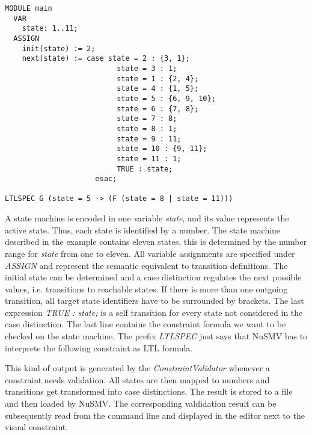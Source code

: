 \begin{lstlisting}[float = htbp, captionpos=b, breaklines=true, showspaces=false, showtabs=false, tabsize=2, caption=Example of a NuSMV diagram file., label=lst:nusmv]
MODULE main
  VAR
    state: 1..11;
  ASSIGN
    init(state) := 2;
    next(state) := case state = 2 : {3, 1};
                          state = 3 : 1;
                          state = 1 : {2, 4};
                          state = 4 : {1, 5};
                          state = 5 : {6, 9, 10};
                          state = 6 : {7, 8};
                          state = 7 : 8;
                          state = 8 : 1;
                          state = 9 : 11;
                          state = 10 : {9, 11};
                          state = 11 : 1;
                          TRUE : state;
                     esac;

LTLSPEC G (state = 5 -> (F (state = 8 | state = 11)))
\end{lstlisting}
A state machine is encoded in one variable \emph{state}, and its value represents the active state. Thus, each state is identified by a number. The state machine described in the example contains eleven states, this is determined by the number range for \emph{state} from one to eleven. All variable assignments are specified under \emph{ASSIGN} and represent the semantic equivalent to transition definitions. The initial state can be determined and a case distinction regulates the next possible values, i.e. transitions to reachable states. If there is more than one outgoing transition, all target state identifiers have to be surrounded by brackets. The last expression \emph{TRUE : state;} is a self transition for every state not considered in the case distinction.
The last line contains the constraint formula we want to be checked on the state machine. The prefix \emph{LTLSPEC} just says that NuSMV has to interprete the following constraint as LTL formula.

This kind of output is generated by the \emph{ConstraintValidator} whenever a constraint needs validation. All states are then mapped to numbers and transitions get transformed into case distinctions. The result is stored to a file and then loaded by NuSMV. The corresponding valdidation result can be subsequently read from the command line and displayed in the editor next to the visual constraint.

